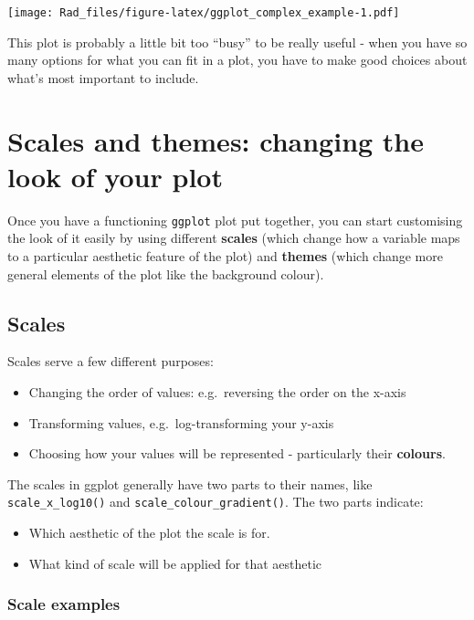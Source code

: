 \documentclass[
]{book}
\providecommand{\tightlist}{%
  \setlength{\itemsep}{0pt}\setlength{\parskip}{0pt}}
\begin{document}
\texttt{[image: Rad\_files/figure-latex/ggplot\_complex\_example-1.pdf]}

This plot is probably a little bit too ``busy'' to be really useful -
when you have so many options for what you can fit in a plot,
you have to make good choices about what's most important to
include.

\hypertarget{scales-and-themes-changing-the-look-of-your-plot}{%
\section{Scales and themes: changing the look of your plot}\label{scales-and-themes-changing-the-look-of-your-plot}}

Once you have a functioning \texttt{ggplot} plot put together,
you can start customising the look of it easily by using
different \textbf{scales} (which change how a variable maps
to a particular aesthetic feature of the plot) and
\textbf{themes} (which change more general elements
of the plot like the background colour).

\hypertarget{scales}{%
\subsection{Scales}\label{scales}}

Scales serve a few different purposes:

\begin{itemize}
\tightlist
\item
  Changing the order of values: e.g.~reversing the order on the x-axis
\item
  Transforming values, e.g.~log-transforming your y-axis
\item
  Choosing how your values will be represented - particularly their
  \textbf{colours}.
\end{itemize}

The scales in ggplot generally have two parts to their names, like
\texttt{scale\_x\_log10()} and \texttt{scale\_colour\_gradient()}. The two parts indicate:

\begin{itemize}
\tightlist
\item
  Which aesthetic of the plot the scale is for.
\item
  What kind of scale will be applied for that aesthetic
\end{itemize}

\hypertarget{scale-examples}{%
\subsubsection*{Scale examples}\label{scale-examples}}
\end{document}
